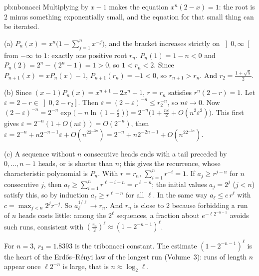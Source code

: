 \begin{solution}{pb:nbonacci}
\idea Multiplying by $x-1$ makes the equation $x^n(2-x)=1$: the root is $2$ minus something exponentially small, and the equation for that small thing can be iterated.

\writeup (a) $P_n(x)=x^n\bigl(1-\sum_{j=1}^nx^{-j}\bigr)$, and the bracket increases strictly on $\left]0,\infty\right[$ from $-\infty$ to $1$: exactly one positive root $r_n$. $P_n(1)=1-n<0$ and $P_n(2)=2^n-(2^n-1)=1>0$, so
$1<r_n<2$. Since $P_{n+1}(x)=xP_n(x)-1$, $P_{n+1}(r_n)=-1<0$, so $r_{n+1}>r_n$. And $r_2=\frac{1+\sqrt5}2$.

(b) Since $(x-1)P_n(x)=x^{n+1}-2x^n+1$, $r=r_n$ satisfies $r^n(2-r)=1$. Let $\varepsilon=2-r\in\left]0,2-r_2\right]$. Then $\varepsilon=(2-\varepsilon)^{-n}\le r_2^{-n}$, so $n\varepsilon\to0$. Now
$(2-\varepsilon)^{-n}=2^{-n}\exp\bigl(-n\ln(1-\frac\varepsilon2)\bigr)=2^{-n}\bigl(1+\frac{n\varepsilon}2+O(n^2\varepsilon^2)\bigr)$. This first gives $\varepsilon=2^{-n}(1+O(n\varepsilon))=O(2^{-n})$, then
$\varepsilon=2^{-n}+n2^{-n-1}\varepsilon+O(n^22^{-3n})=2^{-n}+n2^{-2n-1}+O(n^22^{-3n})$.

(c) A sequence without $n$ consecutive heads ends with a tail preceded by $0,\dots,n-1$ heads, or is shorter than $n$; this gives the recurrence, whose characteristic polynomial is
$P_n$. With $r=r_n$, $\sum_{i=1}^nr^{-i}=1$. If $a_j\ge r^{j-n}$ for $n$ consecutive $j$, then $a_\ell\ge\sum_{i=1}^nr^{\ell-i-n}=r^{\ell-n}$; the initial values $a_j=2^j$ ($j<n$) satisfy this, so by
induction $a_\ell\ge r^{\ell-n}$ for all $\ell$. In the same way $a_\ell\le c\,r^\ell$ with $c=\max_{j<n}2^jr^{-j}$. So $a_\ell^{1/\ell}\to r_n$. And $r_n$ is close to $2$ because forbidding a run of $n$
heads costs little: among the $2^\ell$ sequences, a fraction about $e^{-\ell2^{-n-1}}$ avoids such runs, consistent with $(\frac{r_n}2)^\ell\approx(1-2^{-n-1})^\ell$.

\leads For $n=3$, $r_3=1.8393$ is the tribonacci constant. The estimate $(1-2^{-n-1})^\ell$ is the heart of the Erd\H os--R\'enyi law of the longest run (Volume~3): runs of length $n$ appear once
$\ell2^{-n}$ is large, that is $n\approx\log_2\ell$.
\end{solution}

